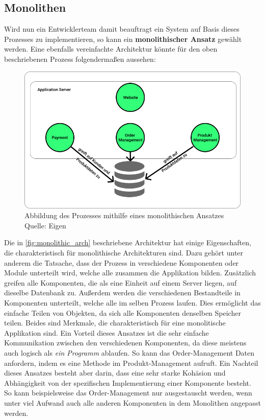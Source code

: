\subsection{Monolithen}
Wird nun ein Entwicklerteam damit beauftragt ein System auf Basis dieses Prozesses zu implementieren, so kann ein \textbf{monolithischer Ansatz} gewählt werden. Eine ebenfalls vereinfachte Architektur könnte für den oben beschriebenen Prozess folgendermaßen aussehen\autocites{Chen2017}{de2019monolithic}:

\begin{figure}[h]
	\centering
	\includegraphics[width=1.0\linewidth]{img/monolitische_architektur.png}
	\caption[monolitische Architektur]{Abbildung des Prozesses mithilfe eines monolithischen Ansatzes\\Quelle: Eigen}
	\label{fig:monolithic_arch}
\end{figure}

Die in \vref{fig:monolithic_arch} beschriebene Architektur hat einige Eigenschaften, die charakteristisch für monolithische Architekturen sind. Dazu gehört unter anderem die Tatsache, dass der Prozess in verschiedene Komponenten oder Module unterteilt wird, welche alle zusammen die Applikation bilden. Zusätzlich greifen alle Komponenten, die als eine Einheit auf einem Server liegen, auf dieselbe Datenbank zu. Außerdem werden die verschiedenen Bestandteile in Komponenten unterteilt, welche alle im selben Prozess laufen. Dies ermöglicht das einfache Teilen von Objekten, da sich alle Komponenten denselben Speicher teilen. Beides sind Merkmale, die charakteristisch für eine monolitische Applikation sind. Ein Vorteil dieses Ansatzes ist die sehr einfache Kommunikation zwischen den verschiedenen Komponenten, da diese meistens auch logisch als \textit{ein Programm} ablaufen. So kann das Order-Management Daten anfordern, indem es eine Methode im Produkt-Management aufruft. Ein Nachteil dieses Ansatzes besteht aber darin, dass eine sehr starke Kohäsion und Abhängigkeit von der spezifischen Implementierung einer Komponente besteht. So kann beispielsweise das Order-Management nur ausgestauscht werden, wenn unter viel Aufwand auch alle anderen Komponenten in dem Monolithen angepasst werden. 

